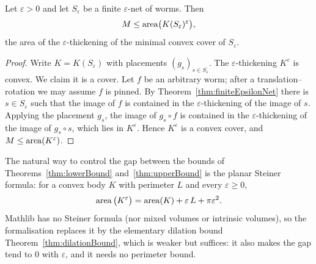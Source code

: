 \begin{theorem}
    \label{thm:upperBound}
    Let $\varepsilon > 0$ and let $S_\varepsilon$ be a finite
    $\varepsilon$-net of worms. Then
    \[
        M \le \operatorname{area}\!\big(K(S_\varepsilon)^{\varepsilon}\big),
    \]
    the area of the $\varepsilon$-thickening of the minimal convex cover of
    $S_\varepsilon$.
\end{theorem}
\begin{proof}
    Write $K = K(S_\varepsilon)$ with placements $(g_s)_{s \in S_\varepsilon}$.
    The $\varepsilon$-thickening $K^{\varepsilon}$ is convex. We claim it is a
    cover. Let $f$ be an arbitrary worm; after a translation--rotation we may
    assume $f$ is pinned. By Theorem~\ref{thm:finiteEpsilonNet} there is
    $s \in S_\varepsilon$ such that the image of $f$ is contained in the
    $\varepsilon$-thickening of the image of $s$. Applying the placement $g_s$,
    the image of $g_s \circ f$ is contained in the $\varepsilon$-thickening of
    the image of $g_s \circ s$, which lies in $K^{\varepsilon}$. Hence
    $K^{\varepsilon}$ is a convex cover, and $M \le \operatorname{area}(K^{\varepsilon})$.
\end{proof}

\begin{remark}
    \label{rem:minkowskiSteinerGap}
    The natural way to control the gap between the bounds of
    Theorems~\ref{thm:lowerBound} and~\ref{thm:upperBound} is the planar Steiner
    formula: for a convex body $K$ with perimeter $L$ and every
    $\varepsilon \ge 0$,
    \[
        \operatorname{area}\big(K^{\varepsilon}\big)
            = \operatorname{area}(K) + \varepsilon\, L + \pi \varepsilon^{2}.
    \]
    Mathlib has no Steiner formula (nor mixed volumes or intrinsic volumes), so
    the formalisation replaces it by the elementary dilation bound
    Theorem~\ref{thm:dilationBound}, which is weaker but suffices: it also makes
    the gap tend to $0$ with $\varepsilon$, and it needs no perimeter bound.
\end{remark}

